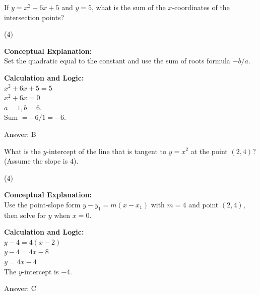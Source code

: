 \documentclass[11pt,paper=a4,answers]{exam}
\begin{document}
\begin{questions}
\question
If $y = x^2 + 6x + 5$ and $y = 5$, what is the sum of the $x$-coordinates of the intersection points?
\begin{tasks}(4)
\end{tasks}

\begin{solution}
\textbf{Conceptual Explanation:} \\
Set the quadratic equal to the constant and use the sum of roots formula $-b/a$.

\vspace{20pt}

\textbf{Calculation and Logic:} \\
$x^2 + 6x + 5 = 5$ \\
$x^2 + 6x = 0$ \\
$a = 1, b = 6$. \\
Sum $= -6/1 = -6$.

\vspace{25pt}

Answer: \colorbox{yellow!100}{B}
\end{solution}

\vspace{40pt}

\question
What is the $y$-intercept of the line that is tangent to $y = x^2$ at the point $(2, 4)$? (Assume the slope is 4).
\begin{tasks}(4)
\end{tasks}

\begin{solution}
\textbf{Conceptual Explanation:} \\
Use the point-slope form $y - y_1 = m(x - x_1)$ with $m = 4$ and point $(2, 4)$, then solve for $y$ when $x = 0$.

\vspace{20pt}

\textbf{Calculation and Logic:} \\
$y - 4 = 4(x - 2)$ \\
$y - 4 = 4x - 8$ \\
$y = 4x - 4$ \\
The $y$-intercept is $-4$.

\vspace{25pt}

Answer: \colorbox{yellow!100}{C}
\end{solution}


\end{questions}
\end{document}
